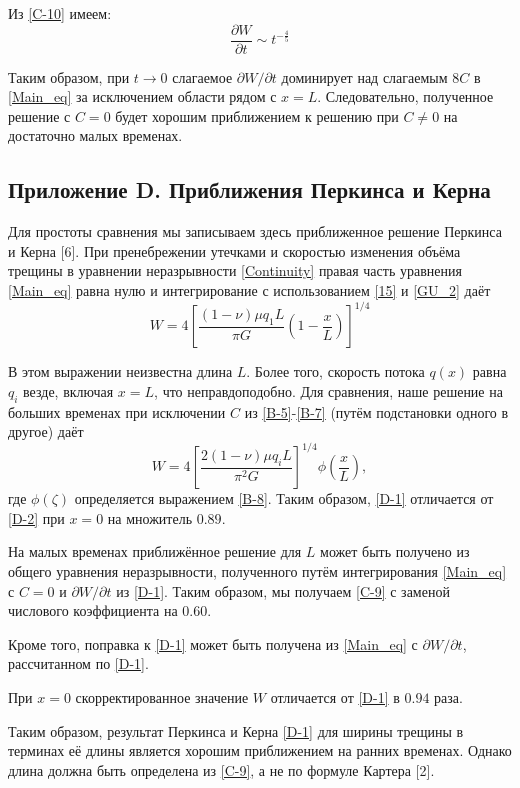 \documentclass[a4paper, 12pt]{article}
\newcommand{\beq}{\begin{equation}}
\newcommand{\eeq}{\end{equation}}
\begin{document}
Из \eqref{C-10} имеем:
\beq\label{C-11}
\frac{\partial W}{\partial t}\sim t^{-\frac{4}{5}}
\tag{C-11}
\eeq

Таким образом, при $t\to0$ слагаемое $\partial W/\partial t$ доминирует над слагаемым $8C$ в \eqref{Main_eq} за исключением области рядом с $x=L$.
Следовательно, полученное решение с $C=0$ будет хорошим приближением к решению при $C\neq 0$ на достаточно малых временах.

\subsection{Приложение D. Приближения Перкинса и Керна}

Для простоты сравнения мы записываем здесь приближенное решение Перкинса и Керна [6].
При пренебрежении утечками и скоростью изменения объёма трещины в уравнении неразрывности \eqref{Continuity} правая часть уравнения \eqref{Main_eq} равна нулю и интегрирование с использованием \eqref{15} и \eqref{GU_2} даёт
\beq\label{D-1}
W=4\left[\frac{(1-\nu)\mu q_1L}{\pi G}\left(1-\frac{x}{L}\right)\right]^{1/4}
\tag{D-1}
\eeq

В этом выражении неизвестна длина $L$.
Более того, скорость потока $q(x)$ равна $q_i$ везде, включая $x=L$, что неправдоподобно.
Для сравнения, наше решение на больших временах при исключении $C$ из \eqref{B-5}-\eqref{B-7} (путём подстановки одного в другое) даёт
\beq\label{D-2}
W=4\left[\frac{2(1-\nu)\mu q_iL}{\pi^2G}\right]^{1/4}\phi\left(\frac{x}{L}\right),
\tag{D-2}
\eeq
где $\phi(\zeta)$ определяется выражением \eqref{B-8}.
Таким образом, \eqref{D-1} отличается от \eqref{D-2} при $x=0$ на множитель $0.89$.

На малых временах приближённое решение для $L$ может быть получено из общего уравнения неразрывности, полученного путём интегрирования \eqref{Main_eq} с $C=0$ и $\partial W/\partial t$ из \eqref{D-1}.
Таким образом, мы получаем \eqref{C-9} с заменой числового коэффициента на $0.60$.

Кроме того, поправка к \eqref{D-1} может быть получена из \eqref{Main_eq} с $\partial W/\partial t$, рассчитанном по \eqref{D-1}.

При $x=0$ скорректированное значение $W$ отличается от \eqref{D-1} в $0.94$ раза.

Таким образом, результат Перкинса и Керна \eqref{D-1} для ширины трещины в терминах её длины является хорошим приближением на ранних временах.
Однако длина должна быть определена из \eqref{C-9}, а не по формуле Картера [2].
\end{document}
